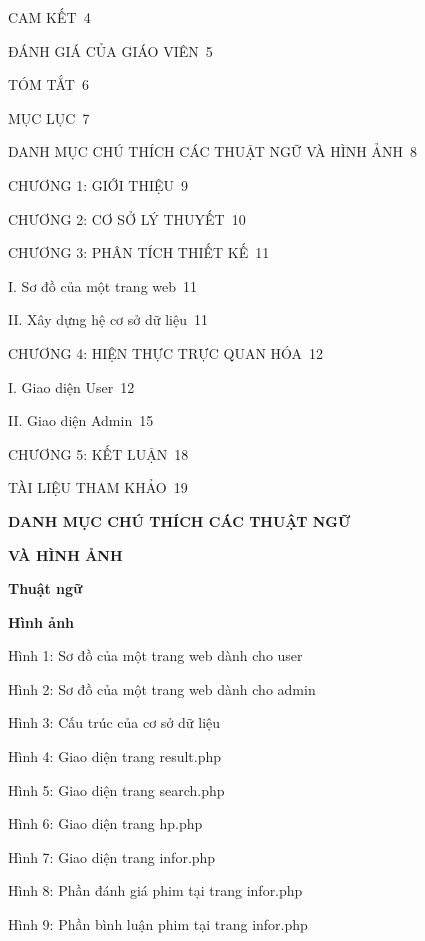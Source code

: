\documentclass{report}
\begin{document}
\smallskip
CAM KẾT\dotfill\ 4

\smallskip
ĐÁNH GIÁ CỦA GIÁO VIÊN\dotfill\ 5

\smallskip
TÓM TẮT\dotfill\ 6

\smallskip
MỤC LỤC\dotfill\ 7

\smallskip
DANH MỤC CHÚ THÍCH CÁC THUẬT NGỮ VÀ HÌNH ẢNH\dotfill\ 8

\smallskip
CHƯƠNG 1: GIỚI THIỆU\dotfill\ 9

\smallskip
CHƯƠNG 2: CƠ SỞ LÝ THUYẾT\dotfill\ 10

\smallskip
CHƯƠNG 3: PHÂN TÍCH THIẾT KẾ\dotfill\ 11

\setlength{\parindent}{0.5cm}
I. Sơ đồ của một trang web\dotfill\ 11

II. Xây dựng hệ cơ sở dữ liệu\dotfill\ 11

\setlength{\parindent}{0cm}
\smallskip
CHƯƠNG 4: HIỆN THỰC TRỰC QUAN HÓA\dotfill\ 12

\setlength{\parindent}{0.5cm}
I. Giao diện User\dotfill\ 12

II. Giao diện Admin\dotfill\ 15

\smallskip
\setlength{\parindent}{0cm}
CHƯƠNG 5: KẾT LUẬN\dotfill\ 18

\setlength{\parindent}{0cm}
\smallskip
TÀI LIỆU THAM KHẢO\dotfill\ 19

\newpage
\changefontsizes{16pt}
\centerline{\textbf{DANH MỤC CHÚ THÍCH CÁC THUẬT NGỮ}}
\centerline{\textbf{VÀ HÌNH ẢNH}}

\vspace{1cm}
\changefontsizes{14pt}
\textbf{Thuật ngữ}


\changefontsizes{14pt}
\bigskip
\textbf{Hình ảnh}
\setlength{\parindent}{1cm}

Hình 1: Sơ đồ của một trang web dành cho user

\smallskip
Hình 2: Sơ đồ của một trang web dành cho admin


\smallskip
Hình 3: Cấu trúc của cơ sở dữ liệu


\smallskip
Hình 4: Giao diện trang result.php


\smallskip
Hình 5: Giao diện trang search.php


\smallskip
Hình 6: Giao diện trang hp.php


\smallskip
Hình 7: Giao diện trang infor.php


\smallskip
Hình 8: Phần đánh giá phim tại trang infor.php


\smallskip
Hình 9: Phần bình luận phim tại trang infor.php
\end{document}
